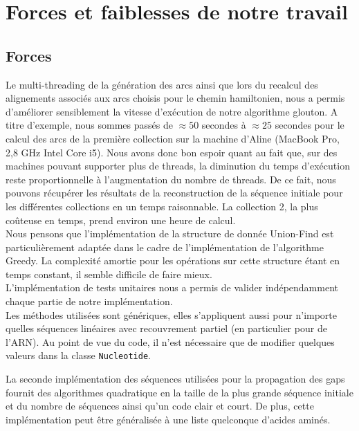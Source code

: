 
\section{Forces et faiblesses de notre travail}

\subsection{Forces}

Le multi-threading de la génération des arcs ainsi que lors du recalcul des alignements associés aux arcs choisis pour le chemin hamiltonien, nous a permis d'améliorer sensiblement la vitesse d'exécution de notre algorithme glouton. A titre d'exemple, nous sommes passés de $\approx 50$ secondes à $\approx 25$ secondes pour le calcul des arcs de la première collection sur la machine d'Aline (MacBook Pro, 2,8 GHz Intel Core i5). Nous avons donc bon espoir quant au fait que, sur des machines pouvant supporter plus de threads, la diminution du temps d'exécution reste proportionnelle à l'augmentation du nombre de threads. De ce fait, nous pouvons récupérer les résultats de la reconstruction de la séquence initiale pour les différentes collections en un temps raisonnable. La collection 2, la plus coûteuse en temps, prend environ une heure de calcul.\\

Nous pensons que l'implémentation de la structure de donnée Union-Find est particulièrement adaptée dans le cadre de l'implémentation de l'algorithme Greedy. La complexité amortie pour les opérations sur cette structure étant en temps constant, il semble difficile de faire mieux.\\

L'implémentation de tests unitaires nous a permis de valider indépendamment chaque partie de notre implémentation.\\

Les méthodes utilisées sont génériques, elles s'appliquent aussi pour n'importe quelles séquences linéaires avec recouvrement partiel (en particulier pour de l'ARN). Au point de vue du code, il n'est nécessaire que de modifier quelques valeurs dans la classe \verb|Nucleotide|.

La seconde implémentation des séquences utilisées pour la propagation des gaps
fournit des algorithmes quadratique en la taille de la plus grande séquence initiale et
du nombre de séquences ainsi qu'un code clair et court. De plus, cette
implémentation peut être généralisée à une liste quelconque d'acides aminés.


